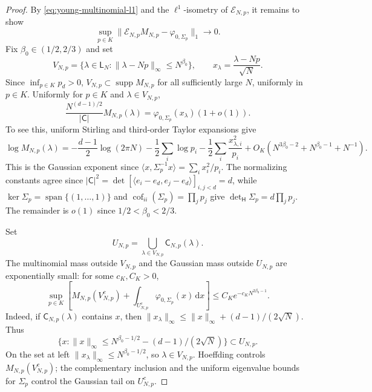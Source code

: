 \documentclass[11pt]{article}
\theoremstyle{remark}
\theoremstyle{plain}
\newcommand{\dd}{\mathrm d}
\begin{document}
\begin{proof}
By \eqref{eq:young-multinomial-l1} and the \(\ell^1\)-isometry
of \(\mathcal E_{N,p}\), it remains to show
\begin{equation}\label{eq:embedded-multinomial-limit}
  \sup_{p\in K}
  \|\mathcal E_{N,p}M_{N,p}-\varphi_{0,\Sigma_p}\|_1\longrightarrow0.
\end{equation}
Fix
\(\beta_0\in(1/2,2/3)\) and set
\[
  V_{N,p}=\{\lambda\in\mathsf L_N:
  \|\lambda-Np\|_\infty\le N^{\beta_0}\},
  \qquad x_\lambda=\frac{\lambda-Np}{\sqrt N}.
\]
Since \(\inf_{p\in K}p_d>0\),
\(V_{N,p}\subset\operatorname{supp}M_{N,p}\) for all sufficiently large
\(N\), uniformly in \(p\in K\).
Uniformly for \(p\in K\) and \(\lambda\in V_{N,p}\),
\begin{equation}\label{eq:multinomial-local-estimate}
  \frac{N^{(d-1)/2}}{|\mathsf C|}M_{N,p}(\lambda)
  =\varphi_{0,\Sigma_p}(x_\lambda)(1+o(1)).
\end{equation}
To see this, uniform Stirling and third-order Taylor expansions give
\[
  \log M_{N,p}(\lambda)
  =-\frac{d-1}{2}\log(2\pi N)-\frac12\sum_i\log p_i
   -\frac12\sum_i\frac{x_{\lambda,i}^2}{p_i}
   +O_K\!\left(N^{3\beta_0-2}+N^{\beta_0-1}+N^{-1}\right).
\]
This is the Gaussian exponent since
\(\langle x,\Sigma_p^{-1}x\rangle=\sum_i x_i^2/p_i\).
The normalizing constants agree since
\(|\mathsf C|^2=\det[\langle e_i-e_d,e_j-e_d\rangle]_{i,j<d}=d\), while
\(\ker\Sigma_p=\operatorname{span}\{(1,\ldots,1)\}\) and
\(\operatorname{cof}_{ii}(\Sigma_p)=\prod_jp_j\) give
\(\det_{\mathsf H}\Sigma_p=d\prod_jp_j\).
The remainder is
\(o(1)\) since \(1/2<\beta_0<2/3\).

Set
\[
  U_{N,p}=\bigcup_{\lambda\in V_{N,p}}\mathsf C_{N,p}(\lambda).
\]
The multinomial mass outside \(V_{N,p}\) and the Gaussian mass
outside \(U_{N,p}\) are exponentially small: for some
\(c_K,C_K>0\),
\begin{equation}\label{eq:multinomial-gaussian-tail}
  \sup_{p\in K}\left[
  M_{N,p}(V_{N,p}^c)
  +\int_{U_{N,p}^c}\varphi_{0,\Sigma_p}(x)\,\dd x
  \right]
  \le C_K e^{-c_K N^{2\beta_0-1}}.
\end{equation}
Indeed, if \(\mathsf C_{N,p}(\lambda)\) contains \(x\), then
\(\|x_\lambda\|_\infty\le\|x\|_\infty+(d-1)/(2\sqrt N)\).  Thus
\[
  \{x:\|x\|_\infty\le
  N^{\beta_0-1/2}-(d-1)/(2\sqrt N)\}\subset U_{N,p}.
\]
On the set at left \(\|x_\lambda\|_\infty\le N^{\beta_0-1/2}\),
so \(\lambda\in V_{N,p}\).  Hoeffding controls \(M_{N,p}(V_{N,p}^c)\);
the complementary inclusion and the uniform eigenvalue bounds for
\(\Sigma_p\) control the Gaussian tail on \(U_{N,p}^c\).


\end{proof}
\end{document}
